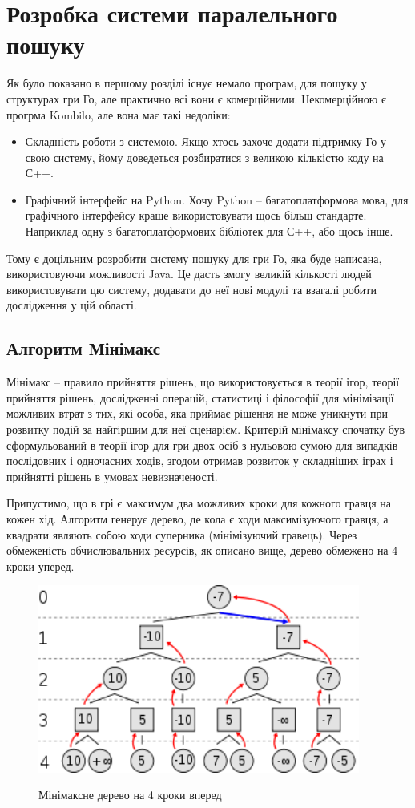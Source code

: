 \newpage
\section{Розробка системи паралельного пошуку}
Як було показано в першому розділі існує немало програм, для пошуку у структурах гри Го, але практично всі вони є комерційними. Некомерційною є прогрма Kombilo, але вона має такі недоліки:
\begin{itemize}
	\item Складність роботи з системою. Якщо хтось захоче додати підтримку Го у свою систему, йому доведеться розбиратися з великою кількістю коду на С++.
	\item Графічний інтерфейс на Python. Хочу Python -- багатоплатформова мова, для графічного інтерфейсу краще використовувати щось більш стандарте. Наприклад одну з багатоплатформових бібліотек для С++, або щось інше.
\end{itemize}

Тому є доцільним розробити систему пошуку для гри Го, яка буде написана, використовуючи можливості Java. Це дасть змогу великій кількості людей використовувати цю систему, додавати до неї нові модулі та взагалі робити дослідження у цій області.

\subsection{Алгоритм Мінімакс}
Мінімакс -- правило прийняття рішень, що використовується в теорії ігор, теорії прийняття рішень, дослідженні операцій, статистиці і філософії для мінімізації можливих втрат з тих, які особа, яка приймає рішення не може уникнути при розвитку подій за найгіршим для неї сценарієм. Критерій мінімаксу спочатку був сформульований в теорії ігор для гри двох осіб з нульовою сумою для випадків послідовних і одночасних ходів, згодом отримав розвиток у складніших іграх і прийнятті рішень в умовах невизначеності.

Припустимо, що в грі є максимум два можливих кроки для кожного гравця на кожен хід. Алгоритм генерує дерево, де кола є ходи максимізуючого гравця, а квадрати являють собою ходи суперника (мінімізуючий гравець). Через обмеженість обчислювальних ресурсів, як описано вище, дерево обмежено на 4 кроки уперед.

\begin{figure}[H]
	\centering
	\caption{Мінімаксне дерево на 4 кроки вперед}
	\includegraphics[width=300pt]{minimax_example}
	\label{fig:minimax_example}
\end{figure}

